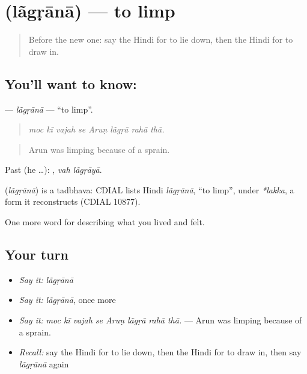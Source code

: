 \section[\texorpdfstring{\hi{लँगड़ाना} (lãgṛānā)}{लँगड़ाना (lãgṛānā)}]{ (lãgṛānā) — to limp}

\label{lesson:HI-C481-lagrana}



\begin{quote}
Before the new one: say the Hindi for to lie down, then the Hindi for to draw in.
\end{quote}

\subsection*{You'll want to know: }
\textbf{} — \emph{lãgṛānā} — \textquotedblleft{}to limp\textquotedblright{}.

\begin{quote}
       
\end{quote}

\begin{quote}
\emph{moc kī vajah se Aruṇ lãgṛā rahā thā.}
\end{quote}

\begin{quote}
Arun was limping because of a sprain.
\end{quote}

Past (he …):  , \emph{vah lãgṛāyā}.

\begin{cousinweb}
\textbf{} (\emph{lãgṛānā}) is a tadbhava: CDIAL lists Hindi \emph{lãgṛānā}, \textquotedblleft{}to limp\textquotedblright{}, under \emph{*lakka}, a form it reconstructs (CDIAL 10877).
\end{cousinweb}

\begin{grammarlens}[title={What you've built}]
One more word for describing what you lived and felt.
\end{grammarlens}

\subsection*{Your turn}
\begin{itemize}
\raggedright
  \item \emph{Say it:} \emph{lãgṛānā}
  \item \emph{Say it:} \emph{lãgṛānā}, once more
  \item \emph{Say it:} \emph{moc kī vajah se Aruṇ lãgṛā rahā thā.} — Arun was limping because of a sprain.
  \item \emph{Recall:} say the Hindi for to lie down, then the Hindi for to draw in, then say \emph{lãgṛānā} again
\end{itemize}

